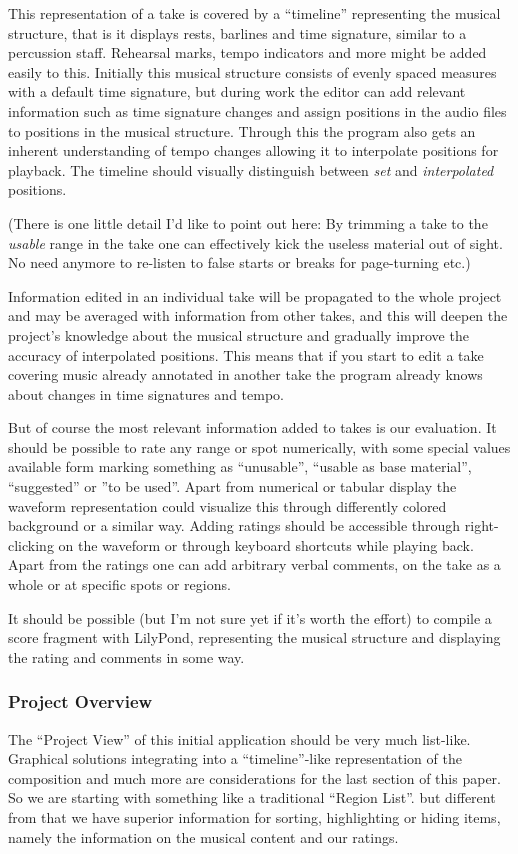 \documentclass[11pt,a4paper]{article}
\begin{document}
This representation of a take is covered by a “timeline” representing the musical structure, that is it displays rests, barlines and time signature, similar to a percussion staff.
Rehearsal marks, tempo indicators and more might be added easily to this.
Initially this musical structure consists of evenly spaced measures with a default time signature, but during work the editor can add relevant information such as time signature changes and assign positions in the audio files to positions in the musical structure.
Through this the program also gets an inherent understanding of tempo changes allowing it to interpolate positions for playback.
The timeline should visually distinguish between \emph{set} and \emph{interpolated} positions.

(There is one little detail I'd like to point out here: By trimming a take to the \emph{usable} range in the take one can effectively kick the useless material out of sight.
No need anymore to re-listen to false starts or breaks for page-turning etc.)

Information edited in an individual take will be propagated to the whole project and may be averaged with information from other takes, and this will deepen the project's knowledge about the musical structure and gradually improve the accuracy of interpolated positions.
This means that if you start to edit a take covering music already annotated in another take the program already knows about changes in time signatures and tempo.

But of course the most relevant information added to takes is our evaluation.
It should be possible to rate any range or spot numerically, with some special values available form marking something as “unusable”, “usable as base material”, “suggested” or ”to be used”.
Apart from numerical or tabular display the waveform representation could visualize this through differently colored background or a similar way.
Adding ratings should be accessible through right-clicking on the waveform or through keyboard shortcuts while playing back.
Apart from the ratings one can add arbitrary verbal comments, on the take as a whole or at specific spots or regions.

It should be possible (but I'm not sure yet if it's worth the effort) to compile a score fragment with LilyPond, representing the musical structure and displaying the rating and comments in some way.

\subsubsection{Project Overview}
The “Project View” of this initial application should be very much list-like.
Graphical solutions integrating into a “timeline”-like representation of the composition and much more are considerations for the last section of this paper.
So we are starting with something like a traditional “Region List”.
but different from that we have superior information for sorting, highlighting or hiding items, namely the information on the musical content and our ratings.
\end{document}
